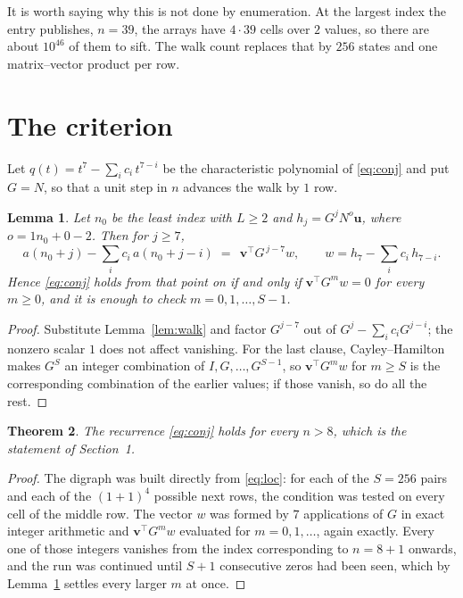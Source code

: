 \documentclass[11pt,a4paper]{article}
\theoremstyle{plain}
\newtheorem{theorem}{Theorem}
\newtheorem{lemma}[theorem]{Lemma}
\theoremstyle{definition}
\begin{document}
It is worth saying why this is not done by enumeration. At the largest index the entry
publishes, $n=39$, the arrays have $4\cdot39$ cells over
$2$ values, so there are about $10^{46}$ of them to sift. The
walk count replaces that by $256$ states and one matrix--vector product per row.
\section{The criterion}

Let $q(t)=t^{7}-\sum_i c_i\,t^{7-i}$ be the characteristic polynomial of
\eqref{eq:conj} and put $G=N$, so that a unit step in $n$ advances the walk by
$1$ row.

\begin{lemma}\label{lem:crit}
Let $n_0$ be the least index with $L\ge2$ and $h_j=G^{j}N^{o}\mathbf{u}$, where
$o=1n_0+0-2$. Then for $j\ge7$,
\[
a(n_0+j)-\sum_i c_i\,a(n_0+j-i)\;=\;\,\mathbf{v}^{\!\top}G^{\,j-7}w,
\qquad w=h_{7}-\sum_i c_i\,h_{7-i} .
\]
Hence \eqref{eq:conj} holds from that point on if and only if
$\mathbf{v}^{\!\top}G^{m}w=0$ for every $m\ge0$, and it is enough to check
$m=0,1,\dots,S-1$.
\end{lemma}

\begin{proof}
Substitute Lemma~\ref{lem:walk} and factor $G^{j-7}$ out of
$G^{j}-\sum_ic_iG^{j-i}$; the nonzero scalar $1$ does not affect
vanishing. For the last clause, Cayley--Hamilton makes $G^{S}$ an integer combination of
$I,G,\dots,G^{S-1}$, so $\mathbf{v}^{\!\top}G^{m}w$ for $m\ge S$ is the corresponding
combination of the earlier values; if those vanish, so do all the rest.
\end{proof}

\begin{theorem}
The recurrence \eqref{eq:conj} holds for every $n>8$, which is the statement of
Section~1.
\end{theorem}

\begin{proof}
The digraph was built directly from \eqref{eq:loc}: for each of the $S=256$ pairs and each
of the $(1+1)^{4}$ possible next rows, the condition was tested on every cell of
the middle row. The vector $w$ was formed by $7$ applications of $G$ in exact integer
arithmetic and $\mathbf{v}^{\!\top}G^{m}w$ evaluated for $m=0,1,\dots$, again exactly.
Every one of those integers vanishes from the index corresponding to $n=8+1$ onwards,
and the run was continued until $S+1$ consecutive zeros had been seen, which by
Lemma~\ref{lem:crit} settles every larger $m$ at once.
\end{proof}
\end{document}
